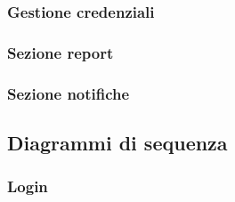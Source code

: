 \subsubsection{Gestione credenziali}
\subsubsection{Sezione report}
\subsubsection{Sezione notifiche}
\subsection{Diagrammi di sequenza}
\subsubsection{Login}
